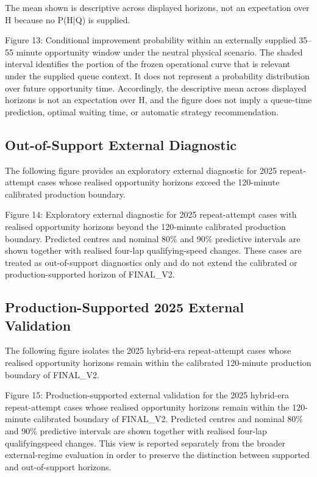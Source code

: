 The mean shown is descriptive across displayed horizons, not an expectation over H because no P(H|Q) is supplied.

Figure 13: Conditional improvement probability within an externally supplied 35--55 minute opportunity window under the neutral physical scenario. The shaded interval identifies the portion of the frozen operational curve that is relevant under the supplied queue context. It does not represent a probability distribution over future opportunity time. Accordingly, the descriptive mean across displayed horizons is not an expectation over H, and the figure does not imply a queue-time prediction, optimal waiting time, or automatic strategy recommendation.

\subsection{Out-of-Support External Diagnostic}
The following figure provides an exploratory external diagnostic for 2025 repeat-attempt cases whose realised opportunity horizons exceed the 120-minute calibrated production boundary.

Figure 14: Exploratory external diagnostic for 2025 repeat-attempt cases with realised opportunity horizons beyond the 120-minute calibrated production boundary. Predicted centres and nominal 80\% and 90\% predictive intervals are shown together with realised four-lap qualifying-speed changes. These cases are treated as out-of-support diagnostics only and do not extend the calibrated or production-supported horizon of FINAL\_V2.

\subsection{Production-Supported 2025 External Validation}
The following figure isolates the 2025 hybrid-era repeat-attempt cases whose realised opportunity horizons remain within the calibrated 120-minute production boundary of FINAL\_V2.

Figure 15: Production-supported external validation for the 2025 hybrid-era repeat-attempt cases whose realised opportunity horizons remain within the 120-minute calibrated boundary of FINAL\_V2. Predicted centres and nominal 80\% and 90\% predictive intervals are shown together with realised four-lap qualifyingspeed changes. This view is reported separately from the broader external-regime evaluation in order to preserve the distinction between supported and out-of-support horizons.


